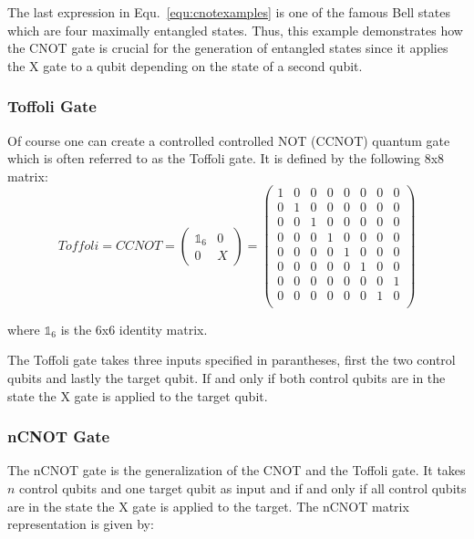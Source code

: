 The last expression in Equ.~\ref{equ:cnotexamples} is one of the famous Bell states which are four maximally entangled states. Thus, this example demonstrates how the CNOT gate is crucial for the generation of entangled states since it applies the X gate to a qubit depending on the state of a second qubit.

\subsubsection{Toffoli Gate}
\label{subsubsubsec:toffoligate}

Of course one can create a controlled controlled NOT (CCNOT) quantum gate which is often referred to as the Toffoli gate. It is defined by the following 8x8 matrix:
\begin{equation}
Toffoli = CCNOT = \begin{pmatrix}
 \mathbb{1}_6 & 0 \\ 
 0 & X
 \end{pmatrix} = \begin{pmatrix}
 1 & 0 & 0 & 0 & 0 & 0 & 0 & 0 \\ 
 0 & 1 & 0 & 0 & 0 & 0 & 0 & 0 \\ 
 0 & 0 & 1 & 0 & 0 & 0 & 0 & 0 \\ 
 0 & 0 & 0 & 1 & 0 & 0 & 0 & 0 \\ 
 0 & 0 & 0 & 0 & 1 & 0 & 0 & 0 \\ 
 0 & 0 & 0 & 0 & 0 & 1 & 0 & 0 \\
 0 & 0 & 0 & 0 & 0 & 0 & 0 & 1 \\ 
 0 & 0 & 0 & 0 & 0 & 0 & 1 & 0 \\ 
 \end{pmatrix}
\end{equation}

where $\mathbb{1}_6$ is the 6x6 identity matrix.

The Toffoli gate takes three inputs specified in parantheses, first the two control qubits and lastly the target qubit. If and only if both control qubits are in the \1 state the X gate is applied to the target qubit.

\subsubsection{nCNOT Gate}
\label{subsubsubsec:ncnotgate}

The nCNOT gate is the generalization of the CNOT and the Toffoli gate. It takes $n$ control qubits and one target qubit as input and if and only if all control qubits are in the \1 state the X gate is applied to the target. The nCNOT matrix representation is given by:
 
